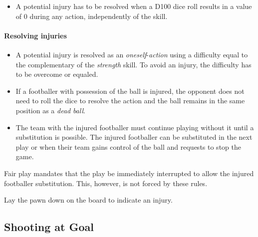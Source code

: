 \documentclass[12pt]{article}
\begin{document}
\begin{rulebox}
\begin{itemize}
\item A potential injury has to be resolved when a D100 dice roll results in a value of 0 during any action, independently of the skill.
\end{itemize}
\end{rulebox}

\paragraph{Resolving injuries}

\begin{rulebox}
\begin{itemize}
\item A potential injury is resolved as an \emph{oneself}-\emph{action} using a difficulty equal to the complementary of the \emph{strength} skill. To avoid an injury, the difficulty has to be overcome or equaled.
\end{itemize}

\begin{itemize}
\item If a footballer with possession of the ball is injured, the opponent does not need to roll the dice to resolve the action and the ball remains in the same position as a \emph{dead} \emph{ball}.
\end{itemize}

\begin{itemize}
\item The team with the injured footballer must continue playing without it until a substitution is possible. The injured footballer can be substituted in the next play or when their team gains control of the ball and requests to stop the game.
\end{itemize}
\end{rulebox}

\begin{note}
Fair play mandates that the play be immediately interrupted to allow the injured footballer substitution. This, however, is not forced by these rules.
\end{note}

\begin{hint}
Lay the pawn down on the board to indicate an injury.
\end{hint}

\subsection{\textbf{Shooting at Goal}}
\end{document}
